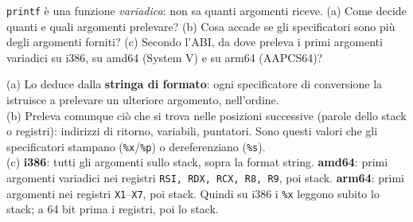 \question[6]
\lstinline|printf| è una funzione \emph{variadica}: non sa quanti argomenti riceve. (a) Come decide quanti e quali argomenti prelevare? (b) Cosa accade se gli specificatori sono più degli argomenti forniti? (c) Secondo l'ABI, da dove preleva i primi argomenti variadici su i386, su amd64 (System V) e su arm64 (AAPCS64)?
\begin{solution}
(a) Lo deduce dalla \textbf{stringa di formato}: ogni specificatore di conversione la istruisce a prelevare un ulteriore argomento, nell'ordine.\\
(b) Preleva comunque ciò che si trova nelle posizioni successive (parole dello stack o registri): indirizzi di ritorno, variabili, puntatori. Sono questi valori che gli specificatori stampano (\lstinline|%x|/\lstinline|%p|) o dereferenziano (\lstinline|%s|).\\
(c) \textbf{i386}: tutti gli argomenti sullo stack, sopra la format string. \textbf{amd64}: primi argomenti variadici nei registri \lstinline|RSI, RDX, RCX, R8, R9|, poi stack. \textbf{arm64}: primi argomenti nei registri \lstinline|X1|--\lstinline|X7|, poi stack. Quindi su i386 i \lstinline|%x| leggono subito lo stack; a 64 bit prima i registri, poi lo stack.
\end{solution}
